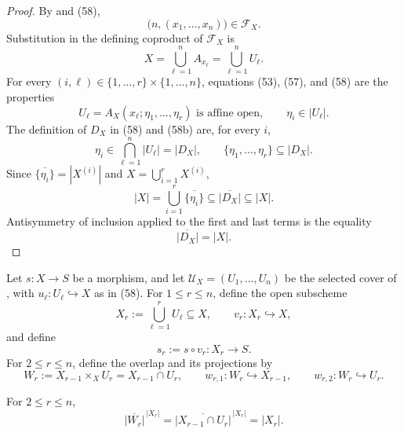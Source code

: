 \begin{proof}
  By  and (58),
  \[
    \bigl(n,(x_1,\ldots,x_n)\bigr)\in\mathscr F_X.
  \]
  Substitution in the defining coproduct of $\mathscr F_X$ is
  \[
    X=\bigcup_{\ell=1}^nA_{x_\ell}
      =\bigcup_{\ell=1}^nU_\ell.                                 \tag{58a}
  \]
  For every $(i,\ell)\in\{1,\ldots,r\}\times\{1,\ldots,n\}$,
  equations (53), (57), and (58) are the properties
  \[
    U_\ell=A_X(x_\ell;\eta_1,\ldots,\eta_r)
      \text{ is affine open},
    \qquad
    \eta_i\in|U_\ell|.                                          \tag{58b}
  \]
  The definition of $D_X$ in (58) and (58b) are, for every $i$,
  \[
    \eta_i\in\bigcap_{\ell=1}^n|U_\ell|=|D_X|,
    \qquad
    \{\eta_1,\ldots,\eta_r\}\subseteq|D_X|.                    \tag{58c}
  \]
  Since $\overline{\{\eta_i\}}=|X^{(i)}|$ and
  $X=\bigcup_{i=1}^rX^{(i)}$,
  \[
    |X|
      =\bigcup_{i=1}^r\overline{\{\eta_i\}}
      \subseteq\overline{|D_X|}
      \subseteq|X|.
  \]
  Antisymmetry of inclusion applied to the first and last terms is the
  equality
  \[
    \overline{|D_X|}=|X|.
  \]
\end{proof}

\begin{definition}
  \label{def:nagata-partial-affine-unions}
  \lean{}

  Let $s\colon X\to S$ be a morphism, and let
  $\mathcal U_X=(U_1,\ldots,U_n)$ be the selected cover of
  , with
  $u_\ell\colon U_\ell\hookrightarrow X$ as in (58).  For
  $1\leq r\leq n$, define the open subscheme
  \[
    X_r:=\bigcup_{\ell=1}^rU_\ell\subseteq X,
    \qquad v_r\colon X_r\hookrightarrow X,
  \]
  and define
  \[
    s_r:=s\circ v_r\colon X_r\to S.
  \]
  For $2\leq r\leq n$, define the overlap and its projections by
  \[
    W_r:=X_{r-1}\times_XU_r=X_{r-1}\cap U_r,
    \qquad
    w_{r,1}\colon W_r\hookrightarrow X_{r-1},
    \qquad
    w_{r,2}\colon W_r\hookrightarrow U_r.
  \]
\end{definition}

\begin{lemma}
  \label{lemma:nagata-partial-union-overlap-dense}
  \lean{}

  For $2\leq r\leq n$,
  \[
    \overline{|W_r|}^{\,|X_r|}
      =\overline{|X_{r-1}\cap U_r|}^{\,|X_r|}=|X_r|.
  \]
\end{lemma}


